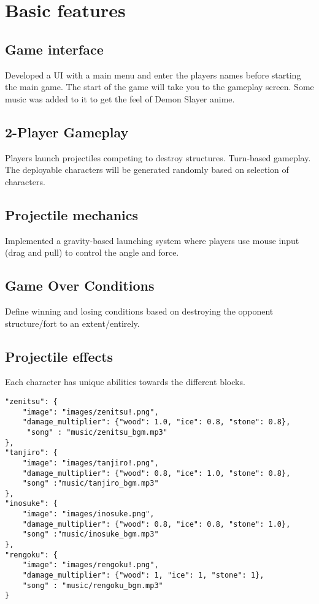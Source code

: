 \documentclass[12pt]{article}
\begin{document}
\section{Basic features}
\subsection{Game interface}
Developed a UI with a main menu and enter the players names before starting the main game. The start of the game will take you to the gameplay screen.
Some music was added to it to get the feel of Demon Slayer anime.

\subsection{2-Player Gameplay}
Players launch projectiles competing to destroy structures. Turn-based gameplay.
The deployable characters will be generated randomly based on selection of characters.

\subsection{Projectile mechanics}
Implemented a gravity-based launching system where players use mouse input (drag and pull) to control the angle and force.

\subsection{Game Over Conditions}
Define winning and losing conditions based on destroying the opponent structure/fort to an extent/entirely.

\subsection{Projectile effects}
Each character has unique abilities towards the different blocks.

\begin{verbatim}
"zenitsu": {
    "image": "images/zenitsu!.png",
    "damage_multiplier": {"wood": 1.0, "ice": 0.8, "stone": 0.8},
     "song" : "music/zenitsu_bgm.mp3"
},
"tanjiro": {
    "image": "images/tanjiro!.png",
    "damage_multiplier": {"wood": 0.8, "ice": 1.0, "stone": 0.8},
    "song" :"music/tanjiro_bgm.mp3"
},
"inosuke": {
    "image": "images/inosuke.png",
    "damage_multiplier": {"wood": 0.8, "ice": 0.8, "stone": 1.0},
    "song" :"music/inosuke_bgm.mp3"
},
"rengoku": {
    "image": "images/rengoku!.png",
    "damage_multiplier": {"wood": 1, "ice": 1, "stone": 1},
    "song" : "music/rengoku_bgm.mp3"
}
\end{verbatim}
\end{document}
